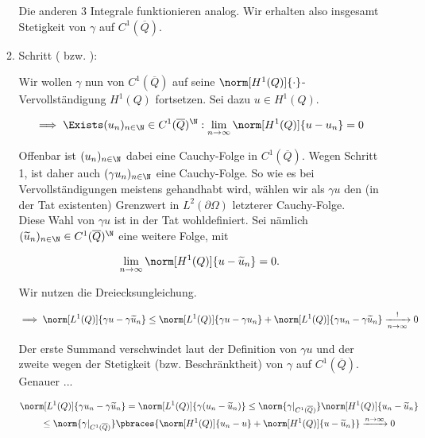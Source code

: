 \begin{solution}
\begin{enumerate}[label = \textbf{\alph*)}]
\begin{enumerate}[label = \arabic*.]
    Die anderen $3$ Integrale funktionieren analog.
    Wir erhalten also insgesamt Stetigkeit von $\gamma$ auf $C^1(\overline{Q})$.

    \item Schritt ( bzw. ):

    Wir wollen $\gamma$ nun von $C^1(\overline{Q})$ auf seine $\norm[H^1(Q)]{\cdot}$-Vervollständigung $H^1(Q)$ fortsetzen.
    Sei dazu $u \in H^1(Q)$.

    \begin{align*}
      \implies
      \Exists (u_n)_{n \in \N} \in C^1(\overline{Q})^\N:
      \lim_{n \to \infty}
      \norm[H^1(Q)]{u - u_n}
      =
      0
    \end{align*}

    Offenbar ist $(u_n)_{n \in \N}$ dabei eine Cauchy-Folge in $C^1(\overline{Q})$.
    Wegen Schritt 1, ist daher auch $(\gamma u_n)_{n \in \N}$ eine Cauchy-Folge.
    So wie es bei Vervollständigungen meistens gehandhabt wird, wählen wir als $\gamma u$ den
    (in der Tat existenten) Grenzwert in $L^2(\partial \Omega)$ letzterer Cauchy-Folge. \\

    Diese Wahl von $\gamma u$ ist in der Tat wohldefiniert.
    Sei nämlich $(\widetilde{u}_n)_{n \in \N} \in C^1(\overline{Q})^\N$ eine weitere Folge, mit

    \begin{align*}
      \lim_{n \to \infty}
      \norm[H^1(Q)]{u - \widetilde{u}_n}
      =
      0.
    \end{align*}

    Wir nutzen die Dreiecksungleichung.

    \begin{align*}
      \implies
      \norm[L^1(Q)]{\gamma u - \gamma \widetilde{u}_n}
      \leq
      \norm[L^1(Q)]{\gamma u - \gamma u_n}
      +
      \norm[L^1(Q)]{\gamma u_n - \gamma \widetilde{u}_n}
      \xrightarrow[n \to \infty]{!}
      0
    \end{align*}

    Der erste Summand verschwindet laut der Definition von $\gamma u$ und der zweite wegen der Stetigkeit (bzw. Beschränktheit) von $\gamma$ auf $C^1(\overline{Q})$.
    Genauer ...

    \begin{multline*}
      \norm[L^1(Q)]{\gamma u_n - \gamma \widetilde{u}_n}
      =
      \norm[L^1(Q)]{\gamma (u_n - \widetilde{u}_n)}
      \leq
      \norm{\gamma|_{C^1(\overline{Q})}}
      \norm[H^1(Q)]{u_n - \widetilde{u}_n} \\
      \leq
      \norm{\gamma|_{C^1(\overline{Q})}}
      \pbraces
      {
        \norm[H^1(Q)]{u_n - u}
        +
        \norm[H^1(Q)]{u - \widetilde{u}_n}
      }
      \xrightarrow[]{n \to \infty}
      0
    \end{multline*}


\end{enumerate}
\end{enumerate}
\end{solution}
